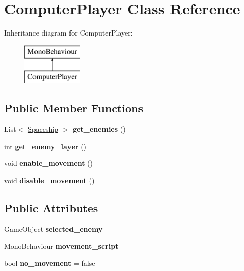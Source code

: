 \hypertarget{class_computer_player}{}\section{Computer\+Player Class Reference}
\label{class_computer_player}
Inheritance diagram for Computer\+Player\+:\begin{figure}[H]
\begin{center}
\leavevmode
\includegraphics[height=2.000000cm]{class_computer_player}
\end{center}
\end{figure}
\subsection*{Public Member Functions}
\begin{DoxyCompactItemize}
\item 
\mbox{\label{class_computer_player_a0b5dc7186a115e08f15a45525dfdf48e}} 
List$<$ \hyperlink{class_spaceship}{Spaceship} $>$ {\bfseries get\+\_\+enemies} ()
\item 
\mbox{\label{class_computer_player_a2a25d6a48ffe69c4f68b2142251f6561}} 
int {\bfseries get\+\_\+enemy\+\_\+layer} ()
\item 
\mbox{\label{class_computer_player_a87ca5cde4b9d5796b4e1442dd0d49573}} 
void {\bfseries enable\+\_\+movement} ()
\item 
\mbox{\label{class_computer_player_a62a1be22712b133ef57e8b01b54f0595}} 
void {\bfseries disable\+\_\+movement} ()
\end{DoxyCompactItemize}
\subsection*{Public Attributes}
\begin{DoxyCompactItemize}
\item 
\mbox{\label{class_computer_player_a1a14ec11162eef9cfc4542ea8506cbe2}} 
Game\+Object {\bfseries selected\+\_\+enemy}
\item 
\mbox{\label{class_computer_player_a6d0f8ad95561dd15d67f90a2abe732cd}} 
Mono\+Behaviour {\bfseries movement\+\_\+script}
\item 
\mbox{\label{class_computer_player_aaf21dbd67f917b8febbf4d88c6765a29}} 
bool {\bfseries no\+\_\+movement} = false
\end{DoxyCompactItemize}
